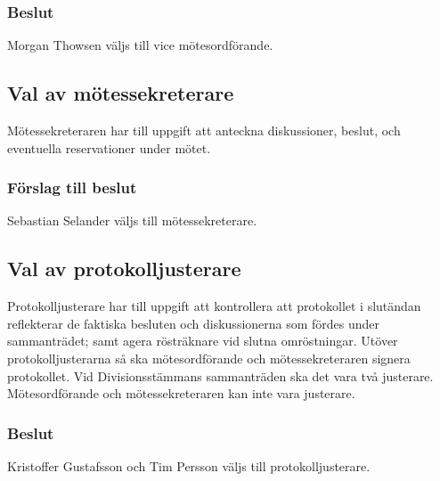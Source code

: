\documentclass[protokoll]{dvd}
\begin{document}
\subsubsection*{Beslut}

\begin{attsatser}
	\item Morgan Thowsen väljs till vice mötesordförande.
\end{attsatser}

\subsection{Val av mötessekreterare}

Mötessekreteraren har till uppgift att anteckna diskussioner, beslut, och eventuella reservationer under mötet.

\subsubsection*{Förslag till beslut}

\begin{attsatser}
	\item Sebastian Selander väljs till mötessekreterare.
\end{attsatser}

\subsection{Val av protokolljusterare}

Protokolljusterare har till uppgift att kontrollera att protokollet i slutändan reflekterar de faktiska besluten och diskussionerna som fördes under sammanträdet; samt agera rösträknare vid slutna omröstningar.
Utöver protokolljusterarna så ska mötesordförande och mötessekreteraren signera protokollet.
Vid Divisionsstämmans sammanträden ska det vara två justerare.
Mötesordförande och mötessekreteraren kan inte vara justerare.

\subsubsection*{Beslut}

    \begin{attsatser}
        \item Kristoffer Gustafsson och Tim Persson väljs till protokolljusterare.
    \end{attsatser}

\newpage
\end{document}
